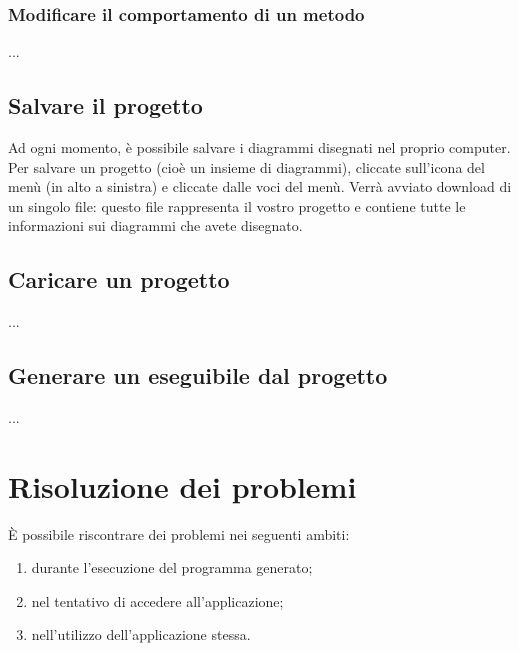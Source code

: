 \subsubsection{Modificare il comportamento di un metodo}
...



\subsection{Salvare il progetto} \label{sec:save} %

Ad ogni momento, è possibile salvare i diagrammi disegnati nel proprio computer. Per salvare un progetto (cioè un insieme di diagrammi), cliccate sull'icona del menù (in alto a sinistra) e cliccate  dalle voci del menù. Verrà avviato download di un singolo file: questo file rappresenta il vostro progetto e contiene tutte le informazioni sui diagrammi che avete disegnato.



\subsection{Caricare un progetto} \label{sec:load}

...



\subsection{Generare un eseguibile dal progetto} \label{sec:gen}

...






\section{Risoluzione dei problemi} \label{sec:problemi}

È possibile riscontrare dei problemi nei seguenti ambiti:
\begin{enumerate}
	\item durante l'esecuzione del programma generato;
	\item nel tentativo di accedere all'applicazione;
	\item nell'utilizzo dell'applicazione stessa.
\end{enumerate}



